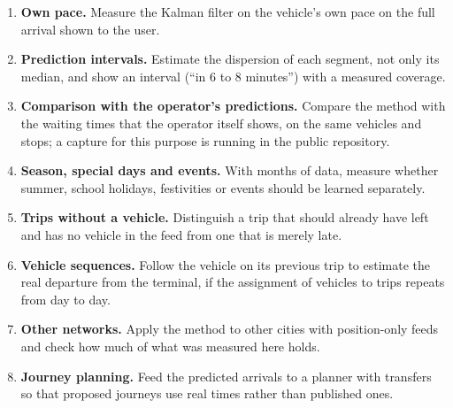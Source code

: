 \begin{enumerate}
  \item \textbf{Own pace.} Measure the Kalman filter on the vehicle's own pace on the full arrival shown to the user.
  \item \textbf{Prediction intervals.} Estimate the dispersion of each segment, not only its median, and show an
        interval (``in 6 to 8 minutes'') with a measured coverage.
  \item \textbf{Comparison with the operator's predictions.} Compare the method with the waiting times that the operator
        itself shows, on the same vehicles and stops; a capture for this purpose is running in the public repository.
  \item \textbf{Season, special days and events.} With months of data, measure whether summer, school holidays,
        festivities or events should be learned separately.
  \item \textbf{Trips without a vehicle.} Distinguish a trip that should already have left and has no vehicle in the
        feed from one that is merely late.
  \item \textbf{Vehicle sequences.} Follow the vehicle on its previous trip to estimate the real departure from the
        terminal, if the assignment of vehicles to trips repeats from day to day.
  \item \textbf{Other networks.} Apply the method to other cities with position-only feeds and check how much of what
        was measured here holds.
  \item \textbf{Journey planning.} Feed the predicted arrivals to a planner with transfers so that proposed journeys use
        real times rather than published ones.
\end{enumerate}
